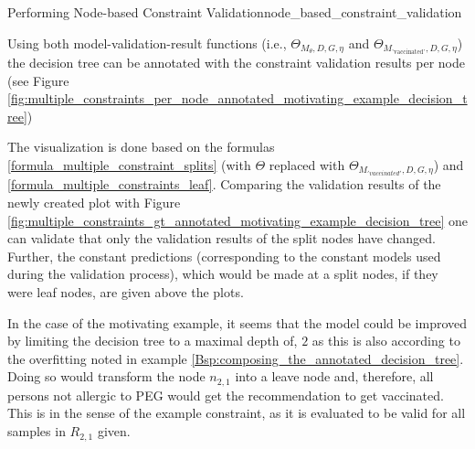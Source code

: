 \begin{Bsp}{Performing Node-based Constraint Validation}{node_based_constraint_validation}
    
    Using both model-validation-result functions (i.e., $\Theta_{M_{\theta},D,G,\eta}$ and $\Theta_{M_{\text{'vaccinated'}},D,G,\eta}$) the decision tree can be annotated with the constraint validation results per node (see Figure \ref{fig:multiple_constraints_per_node_annotated_motivating_example_decision_tree}) 
    
    The visualization is done based on the formulas \ref{formula_multiple_constraint_splits} (with $\Theta$ replaced with $\Theta_{M_{'vaccinated'},D,G,\eta}$) and \ref{formula_multiple_constraints_leaf}. Comparing the validation results of the newly created plot with Figure \ref{fig:multiple_constraints_gt_annotated_motivating_example_decision_tree} one can validate that only the validation results of the split nodes have changed. Further, the constant predictions (corresponding to the constant models used during the validation process), which would be made at a split nodes, if they were leaf nodes, are given above the plots. 
    
    In the case of the motivating example, it seems that the model could be improved by limiting the decision tree to a maximal depth of, $2$ as this is also according to the overfitting noted in example \ref{Bsp:composing_the_annotated_decision_tree}. Doing so would transform the node $n_{2,1}$ into a leave node and, therefore, all persons not allergic to \glqq PEG\grqq{} would get the recommendation to get vaccinated. This is in the sense of the example constraint, as it is evaluated to be valid for all samples in $R_{2,1}$ given.
    

\end{Bsp}
